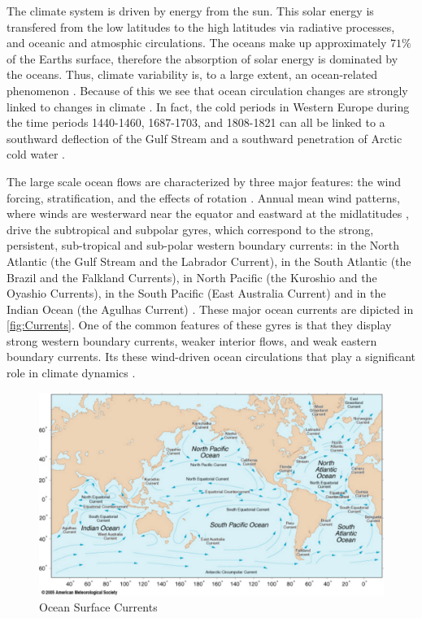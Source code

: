 The climate system is driven by energy from the sun. This solar energy is transfered from the low
latitudes to the high latitudes via radiative processes, and oceanic and atmosphic circulations. The
oceans make up approximately $71\%$ of the Earths surface, therefore the absorption of solar energy
is dominated by the oceans. Thus, climate variability is, to a large extent, an ocean-related
phenomenon \cite{Siedler01}. Because of this we see that ocean circulation changes are strongly
linked to changes in climate \cite{Morner95, Siedler01}. In fact, the cold periods in Western Europe
during the time periods 1440-1460, 1687-1703, and 1808-1821 can all be linked to a southward
deflection of the Gulf Stream and a southward penetration of Arctic cold water \cite{Morner95}.


The large scale ocean flows are characterized by three major features: the wind forcing,
stratification, and the effects of rotation \cite{Majda, Vallis06}. Annual mean wind patterns,
where winds are westerward near the equator and eastward at the midlatitudes \cite{Dijkstra08},
drive the subtropical and subpolar gyres, which correspond to the strong, persistent, sub-tropical
and sub-polar western boundary currents: in the North Atlantic (the Gulf Stream and the Labrador
Current), in the South Atlantic (the Brazil and the Falkland Currents), in North Pacific (the
Kuroshio and the Oyashio Currents), in the South Pacific (East Australia Current) and in the Indian
Ocean (the Agulhas Current) \cite{Dijkstra08,Vallis06}. These major ocean currents are dipicted in
\autoref{fig:Currents}. One of the common features of these gyres is that they display strong
western boundary currents, weaker interior flows, and weak eastern boundary currents. Its these
wind-driven ocean circulations that play a significant role in climate dynamics
\cite{Dijkstra05,Ghil08}.

\begin{figure}[H] 
  \begin{center}
    \includegraphics[scale=0.5]{Currents.pdf}
    \caption{Ocean Surface Currents}
    \label{fig:Currents}
  \end{center}
\end{figure}

